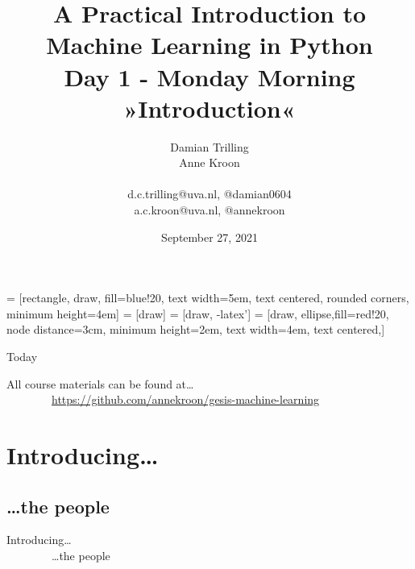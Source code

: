 \documentclass[handout]{beamer}
\title[Big Data and Automated Content Analysis]{\textbf{A Practical Introduction to Machine Learning in Python} \\Day 1 - Monday  Morning\\ »Introduction«}
\author[Damian Trilling, Anne Kroon]{Damian Trilling \\ Anne Kroon \\ ~ \\ \footnotesize{d.c.trilling@uva.nl, @damian0604 \\a.c.kroon@uva.nl, @annekroon} \\}
\date{September 27, 2021}
\institute[Gesis]{Gesis}
\begin{document}
 = [rectangle, draw, fill=blue!20, 
text width=5em, text centered, rounded corners, minimum height=4em]
 = [draw]
 = [draw, -latex']
 = [draw, ellipse,fill=red!20, node distance=3cm,
minimum height=2em, text width=4em, text centered,]




\begin{frame}{}
\titlepage
\end{frame}

\begin{frame}{Today}
\tableofcontents
\end{frame}


\begin{frame} 
All course materials can be found at\ldots \\
~~~~~~~~\url{https://github.com/annekroon/gesis-machine-learning}
\end{frame}

\section{Introducing\ldots}
\subsection{\ldots the people}

\begin{frame} 
Introducing\ldots \\
~~~~~~~~\ldots the people
\end{frame}
\end{document}
